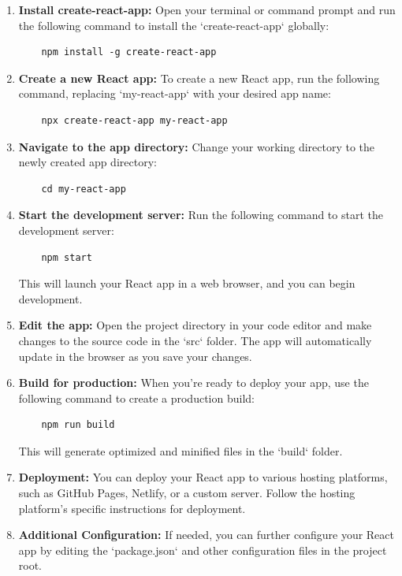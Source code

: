 \documentclass[11pt]{article}
\begin{document}
\begin{enumerate}
    \item \textbf{Install create-react-app:} Open your terminal or command prompt and run the following command to install the `create-react-app` globally:
    \begin{verbatim}
    npm install -g create-react-app
    \end{verbatim}
    
    \item \textbf{Create a new React app:} To create a new React app, run the following command, replacing `my-react-app` with your desired app name:
    \begin{verbatim}
    npx create-react-app my-react-app
    \end{verbatim}
    
    \item \textbf{Navigate to the app directory:} Change your working directory to the newly created app directory:
    \begin{verbatim}
    cd my-react-app
    \end{verbatim}
    
    \item \textbf{Start the development server:} Run the following command to start the development server:
    \begin{verbatim}
    npm start
    \end{verbatim}
    This will launch your React app in a web browser, and you can begin development.
    
    \item \textbf{Edit the app:} Open the project directory in your code editor and make changes to the source code in the `src` folder. The app will automatically update in the browser as you save your changes.
    
    \item \textbf{Build for production:} When you're ready to deploy your app, use the following command to create a production build:
    \begin{verbatim}
    npm run build
    \end{verbatim}
    This will generate optimized and minified files in the `build` folder.
    
    \item \textbf{Deployment:} You can deploy your React app to various hosting platforms, such as GitHub Pages, Netlify, or a custom server. Follow the hosting platform's specific instructions for deployment.
    
    \item \textbf{Additional Configuration:} If needed, you can further configure your React app by editing the `package.json` and other configuration files in the project root.
\end{enumerate}
\end{document}
